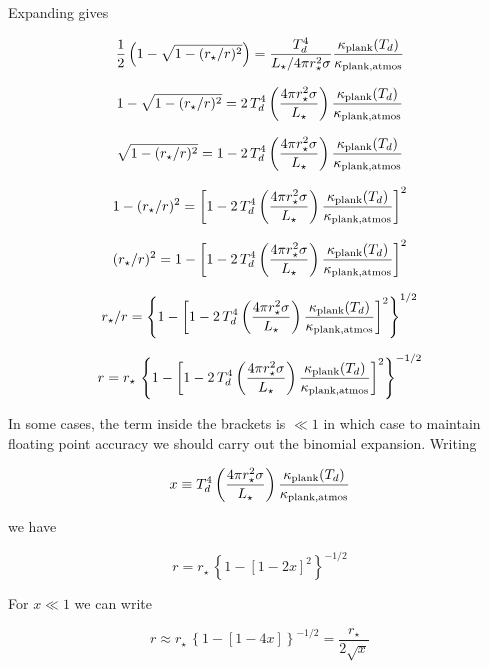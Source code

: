 \documentclass[11pt]{article}
\begin{document}
Expanding gives

$$
 \frac{1}{2}\left(1-\sqrt{1-(r_{\star}/r)^2}\right) = \frac{T_d^4}{L_\star/4\pi r_\star^2\sigma}\frac{\kappa_{\rm plank}(T_d)}{\kappa_{\rm plank, atmos}}
$$

$$
1-\sqrt{1-(r_{\star}/r)^2} = 2\,T_d^4\left(\frac{4\pi r_\star^2\sigma}{L_\star}\right)\frac{\kappa_{\rm plank}(T_d)}{\kappa_{\rm plank, atmos}}
$$

$$
\sqrt{1-(r_{\star}/r)^2} = 1-2\,T_d^4\left(\frac{4\pi r_\star^2\sigma}{L_\star}\right)\frac{\kappa_{\rm plank}(T_d)}{\kappa_{\rm plank, atmos}}
$$

$$
1-(r_{\star}/r)^2 = \left[1-2\,T_d^4\left(\frac{4\pi r_\star^2\sigma}{L_\star}\right)\frac{\kappa_{\rm plank}(T_d)}{\kappa_{\rm plank, atmos}}\right]^2
$$

$$
(r_{\star}/r)^2 = 1-\left[1-2\,T_d^4\left(\frac{4\pi r_\star^2\sigma}{L_\star}\right)\frac{\kappa_{\rm plank}(T_d)}{\kappa_{\rm plank, atmos}}\right]^2
$$

$$
r_{\star}/r = \left\{1-\left[1-2\,T_d^4\left(\frac{4\pi r_\star^2\sigma}{L_\star}\right)\frac{\kappa_{\rm plank}(T_d)}{\kappa_{\rm plank, atmos}}\right]^2\right\} ^ {1/2}
$$

$$
r = r_{\star} \,  \left\{1-\left[1-2\,T_d^4\left(\frac{4\pi r_\star^2\sigma}{L_\star}\right)\frac{\kappa_{\rm plank}(T_d)}{\kappa_{\rm plank, atmos}}\right]^2\right\} ^ {-1/2}
$$

In some cases, the term inside the brackets is $\ll 1$ in which case to maintain floating point accuracy we should carry out the binomial expansion. Writing

$$
x \equiv T_d^4\left(\frac{4\pi r_\star^2\sigma}{L_\star}\right)\frac{\kappa_{\rm plank}(T_d)}{\kappa_{\rm plank, atmos}}
$$

we have

$$
r = r_{\star} \,  \left\{1-\left[1-2x \right]^2\right\} ^ {-1/2}
$$

For $x\ll 1$ we can write

$$
r \approx r_{\star} \,  \left\{1-\left[1-4x \right]\right\} ^ {-1/2} =  \frac{r_{\star}}{2\sqrt{x}}
$$
\end{document}
